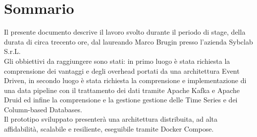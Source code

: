 \cleardoublepage
{}
{}
\begingroup
\let\clearpage\relax
\let\cleardoublepage\relax
\let\cleardoublepage\relax

\chapter*{Sommario}

Il presente documento descrive il lavoro svolto durante il periodo di stage, della durata di circa trecento ore, dal laureando Marco Brugin presso l'azienda Sybclab S.r.L.
\\Gli obbiettivi da raggiungere sono stati:
in primo luogo è stata richiesta la comprensione dei vantaggi e degli overhead portati da una architettura Event Driven,
in secondo luogo è stata richiesta la comprensione e implementazione di una data pipeline con il trattamento dei dati tramite Apache Kafka e Apache Druid ed infine la comprensione e la gestione gestione delle Time Series e dei Column-based Databases.
\\Il prototipo sviluppato presenterà una architettura distribuita, ad alta affidabilità, scalabile e resiliente, eseguibile tramite Docker Compose.



\endgroup

\vfill
